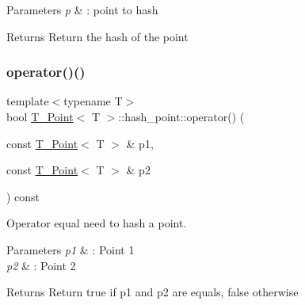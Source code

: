 \begin{DoxyParams}{Parameters}
{\em p} & \+: point to hash \\
\hline
\end{DoxyParams}
\begin{DoxyReturn}{Returns}
Return the hash of the point 
\end{DoxyReturn}
\mbox{\label{structT__Point_1_1hash__point_a92f4c83c6538fcb66804d44e944d7b20}} 
\subsubsection{\texorpdfstring{operator()()}{operator()()}\hspace{0.1cm}{\footnotesize\ttfamily [3/4]}}
{\footnotesize\ttfamily template$<$typename T$>$ \\
bool \hyperlink{classT__Point}{T\+\_\+\+Point}$<$ T $>$\+::hash\+\_\+point\+::operator() (\begin{DoxyParamCaption}\item[{const \hyperlink{classT__Point}{T\+\_\+\+Point}$<$ T $>$ \&}]{p1,  }\item[{const \hyperlink{classT__Point}{T\+\_\+\+Point}$<$ T $>$ \&}]{p2 }\end{DoxyParamCaption}) const\hspace{0.3cm}{\ttfamily [inline]}}



Operator equal need to hash a point. 


\begin{DoxyParams}{Parameters}
{\em p1} & \+: Point 1 \\
\hline
{\em p2} & \+: Point 2 \\
\hline
\end{DoxyParams}
\begin{DoxyReturn}{Returns}
Return true if p1 and p2 are equals, false otherwise 
\end{DoxyReturn}
\mbox{\label{structT__Point_1_1hash__point_a92f4c83c6538fcb66804d44e944d7b20}} 
